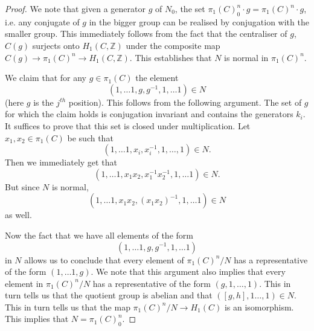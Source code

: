 \documentclass{article}
\newcommand{\ZZ}{ \mathbb{Z}}
\begin{document}
\begin{proof}
We note that given a generator $g$ of $N_0$, the set $\pi_1(C)^n_0 \cdot g = \pi_1(C)^n \cdot g$, i.e. any conjugate of $g$ in the bigger group can be realised by conjugation with the smaller group. This immediately follows from the fact that the centraliser of $g$, $C(g)$ surjects onto $H_1(C, \ZZ)$ under the composite map $C(g) \to \pi_1(C)^n \to H_1(C,\ZZ).$
This establishes that $N$ is normal in $\pi_1(C)^n.$

We claim that for any $g \in \pi_1(C)$ the element $$(1 , \dots 1, g, g^{-1}, 1 , \dots 1)\in N$$ (here $g$ is the $j^{th}$ position). This follows from the following argument. The set of $g$ for which the claim holds is conjugation invariant and contains the generators $k_i$. It suffices to prove that this set is closed under multiplication.  Let $x_1, x_2 \in \pi_1(C)$ be such that $$(1 ,\dots 1 , x_i , x_i^{-1} , 1, \dots, 1) \in N.$$ Then we immediately get that $$(1 , \dots 1, x_1 x_2 , x_1^{-1} x_2^{-1}, 1 , \dots 1) \in N.$$ But since $N$ is normal, $$(1 , \dots 1, x_1 x_2 , (x_1x_2)^{-1}, 1 , \dots 1) \in N$$ as well.


Now the fact that we have all elements of the form  $$(1 , \dots 1, g, g^{-1}, 1 , \dots 1)$$ in $N$ allows us to conclude that every element of $\pi_1(C)^n / N$ has a representative of the form $(1 , \dots 1 , g).$
We note that this argument also implies that every element in $\pi_1(C)^n/N$ has a representative of the form  $(g, 1 ,\dots,1).$ This in turn tells us that the quotient group is abelian and  that $([g,h] ,1 \dots , 1) \in N.$ This in turn tells us that the map $\pi_1(C)^n /N \to H_1(C)$ is an isomorphism. This implies that $N = \pi_1(C)^n_0.$
\end{proof}
\end{document}
